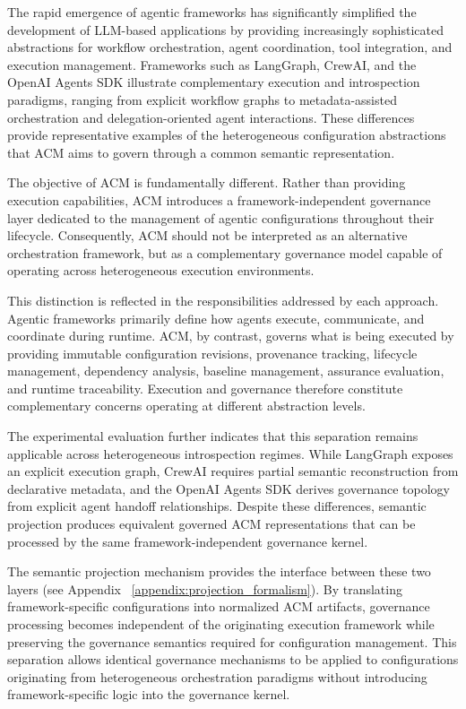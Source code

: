 \documentclass[10pt]{article}
\begin{document}
The rapid emergence of agentic frameworks has significantly simplified the development of LLM-based applications by providing increasingly sophisticated abstractions for workflow orchestration, agent coordination, tool integration, and execution management. Frameworks such as LangGraph, CrewAI, and the OpenAI Agents SDK illustrate complementary execution and introspection paradigms, ranging from explicit workflow graphs to metadata-assisted orchestration and delegation-oriented agent interactions. These differences provide representative examples of the heterogeneous configuration abstractions that ACM aims to govern through a common semantic representation.

The objective of ACM is fundamentally different. Rather than providing execution capabilities, ACM introduces a framework-independent governance layer dedicated to the management of agentic configurations throughout their lifecycle. Consequently, ACM should not be interpreted as an alternative orchestration framework, but as a complementary governance model capable of operating across heterogeneous execution environments.

This distinction is reflected in the responsibilities addressed by each approach. Agentic frameworks primarily define how agents execute, communicate, and coordinate during runtime. ACM, by contrast, governs what is being executed by providing immutable configuration revisions, provenance tracking, lifecycle management, dependency analysis, baseline management, assurance evaluation, and runtime traceability. Execution and governance therefore constitute complementary concerns operating at different abstraction levels.

The experimental evaluation further indicates that this separation remains applicable across heterogeneous introspection regimes. While LangGraph exposes an explicit execution graph, CrewAI requires partial semantic reconstruction from declarative metadata, and the OpenAI Agents SDK derives governance topology from explicit agent handoff relationships. Despite these differences, semantic projection produces equivalent governed ACM representations that can be processed by the same framework-independent governance kernel.

The semantic projection mechanism provides the interface between these two layers (see Appendix ~\ref{appendix:projection_formalism}). By translating framework-specific configurations into normalized ACM artifacts, governance processing becomes independent of the originating execution framework while preserving the governance semantics required for configuration management. This separation allows identical governance mechanisms to be applied to configurations originating from heterogeneous orchestration paradigms without introducing framework-specific logic into the governance kernel.
\end{document}
